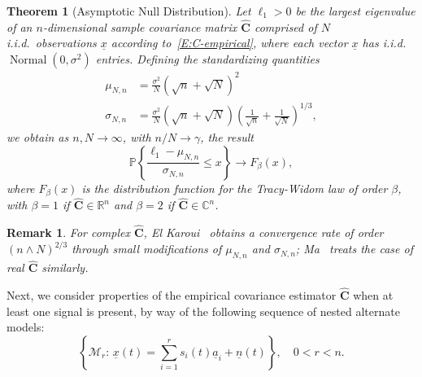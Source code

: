 \documentclass[final]{IEEEtran} %
\newtheorem{theorem}{Theorem}
\newtheorem{rem}{Remark}
\newcommand{\vectorsymbol}{\underline}
\newcommand{\matrixsymbol}{\boldsymbol}
\newcommand{\mhC}{\widehat{\matrixsymbol{C}}}
\newcommand{\va}{\vectorsymbol{a}}
\newcommand{\vn}{\vectorsymbol{n}}
\newcommand{\vx}{\vectorsymbol{x}}
\newcommand{\Prob}{\mathbb{P}}
\begin{document}
\begin{theorem}[Asymptotic Null Distribution]\label{T:null-value}
    Let $\ell_1 > 0$ be the largest eigenvalue of an $n$-dimensional sample covariance matrix $\mhC$ comprised of $N$ i.i.d.~observations $\vx$ according to~\eqref{E:C-empirical}, where each vector $\vx$ has i.i.d.~$\operatorname{Normal}(0,\sigma^2)$ entries. Defining the standardizing quantities
    \begin{align*}
        \mu_{N,n}
            &=
            \frac{\sigma^2}{N}
            \left( \sqrt{n} + \sqrt{N} \right)^2 \\
        \sigma_{N,n}
            &=
            \frac{\sigma^2}{N} \textstyle
            \left( \sqrt{n} + \sqrt{N} \right)
            \left( \frac{1}{\sqrt{n}} + \frac{1}{\sqrt{N}} \right)^{1/3},
    \end{align*}
    we obtain as $n,N\to\infty$, with $n/N\to \gamma$, the result
    \begin{equation*}
        \Prob \left\{ \frac{\ell_1 - \mu_{N,n}}{\sigma_{N,n}} \leq x \right\}
        \to
        F_\beta ( x ),
    \end{equation*}
    where $F_\beta( x )$ is the distribution function for the Tracy-Widom law of
    order $\beta$, with $\beta = 1$ if $\mhC \in \mathbb{R}^n$ and $\beta = 2$ if $\mhC \in \mathbb{C}^n$.
\end{theorem}

\begin{rem}
For complex $\mhC$, El Karoui~\cite{elkaroui2006rcr} obtains a convergence rate of order $(n\wedge N)^{2/3}$ through small modifications of $\mu_{N,n}$ and $\sigma_{N,n}$; Ma~\cite{ma2008atw} treats the case of real $\mhC$ similarly.
\end{rem}

Next, we consider properties of the empirical covariance estimator $\mhC$ when at least one signal is present, by way of the following sequence of nested alternate models:
\begin{equation}\label{E:SignalAlt}
    \left\{ \mathcal{M}_r\!:\, \vx(t) = \sum_{i=1}^{r} s_{i}(t) \va_{i} + \vn(t) \right\}, \quad 0 < r < n.
\end{equation}
\end{document}
